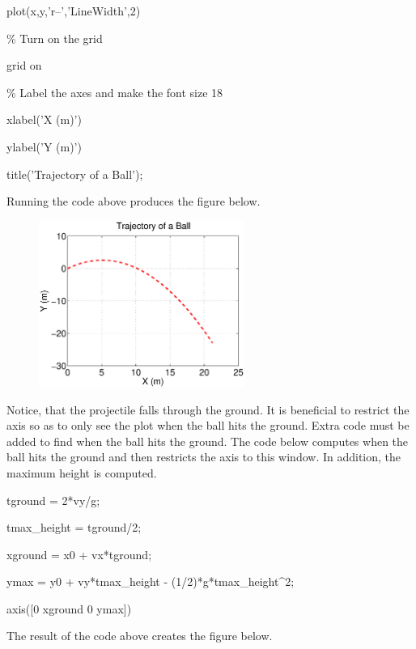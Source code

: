 \begin{enumerate}
\begin{framed}
plot(x,y,'r--','LineWidth',2) 

\textcolor{OliveGreen}{\% Turn on the grid}

grid on 

\textcolor{OliveGreen}{\% Label the axes and make the font size 18}

xlabel('X (m)')

ylabel('Y (m)')

title('Trajectory of a Ball');

\end{framed}

Running the code above produces the figure below. 

\begin{figure}[htb]
  \begin{center}
    \includegraphics[height=0.45\textwidth,width=0.6\textwidth]{Graphics/Example_Plot}
  \end{center}
\end{figure}

Notice, that the projectile falls through the ground. It is beneficial
to restrict the axis so as to only see the plot when the ball hits the
ground. Extra code must be added to find when the ball hits the
ground. The code below computes when the ball hits the ground and then
restricts the axis to this window. In addition, the maximum height is
computed.

\begin{framed}

tground = 2*vy/g;

tmax\_height = tground/2;

xground = x0 + vx*tground;

ymax = y0 + vy*tmax\_height - (1/2)*g*tmax\_height\textrm{\^}2;

axis([0 xground 0 ymax])

\end{framed}

The result of the code above creates the figure below. 


\end{enumerate}
